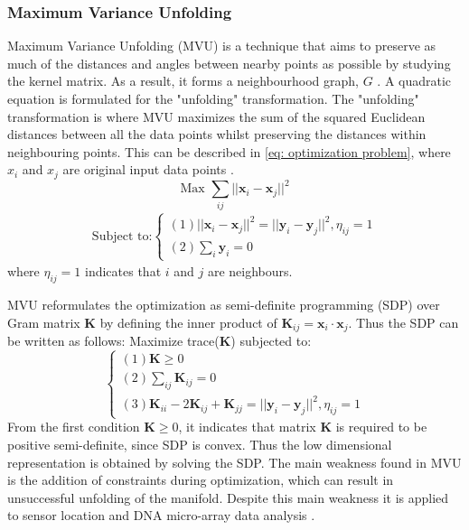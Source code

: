 \documentclass[11pt]{article}
\begin{document}
	\subsubsection{Maximum Variance Unfolding}
	Maximum Variance Unfolding (MVU) is a technique that aims to preserve as much of the distances and angles between nearby points as possible by studying the kernel matrix. As a result, it forms a neighbourhood graph, $G$ \cite{Jiang2011}. A quadratic equation is formulated for the "unfolding" transformation. The "unfolding" transformation is where MVU maximizes the sum of the squared Euclidean distances between all the data points whilst preserving the distances within neighbouring points. This can be described in \eqref{eq: optimization problem}, where $x_i$ and $x_j$ are original input data points \cite{Jiang2011,weinberger2006introduction}.
	\begin{equation}
		\text{Max } \sum_{ij}||\textbf{x}_i - \textbf{x}_j||^{2}
		\label{eq: optimization problem}
	\end{equation}
	\begin{align*}
		\text{Subject to:}
		\begin{cases}
			(1)||\textbf{x}_i - \textbf{x}_j||^{2} = ||\textbf{y}_i - \textbf{y}_j||^{2} , \eta_{ij} = 1 \\
			(2)\sum_{i}\textbf{y}_i = 0
		\end{cases}
	\end{align*}
	where $\eta_{ij} = 1$ indicates that $i$ and $j$ are neighbours. 

	MVU reformulates the optimization as semi-definite programming (SDP) over Gram matrix $\textbf{K}$ by defining the inner product of $\textbf{K}_{ij} = \textbf{x}_i \cdot \textbf{x}_j$. Thus the SDP can be written as follows: 
	\newline
	Maximize trace(\textbf{K}) subjected to:
	\begin{equation}
		\begin{cases}
			(1) \textbf{K} \geq 0 \\
			(2) \sum_{ij} \textbf{K}_{ij} = 0 \\
			(3) \textbf{K}_{ii} - 2\textbf{K}_{ij} + \textbf{K}_{jj} = ||\textbf{y}_i - \textbf{y}_j||^{2}, \eta_{ij} = 1
		\end{cases}
	\end{equation} 
	From the first condition $\textbf{K} \geq 0$, it indicates that matrix $\textbf{K}$ is required to be positive semi-definite, since SDP is convex. Thus the low dimensional representation is obtained by solving the SDP. The main weakness found in MVU is the addition of constraints during optimization, which can result in unsuccessful unfolding of the manifold. Despite this main weakness it is applied to sensor location and DNA micro-array data analysis \cite{van2009dimensionality}.
	
\end{document}
